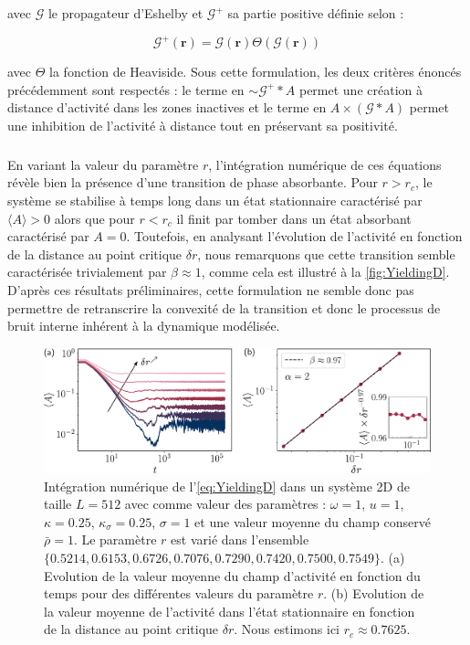 \noindent avec $\mathcal{G}$ le propagateur d'Eshelby et $\mathcal{G}^+$ sa partie positive définie selon :

\begin{equation}
	\mathcal{G}^+(\mathbf{r}) = \mathcal{G}(\mathbf{r})\Theta\left(\mathcal{G}(\mathbf{r})\right)
\end{equation}

\noindent avec $\Theta$ la fonction de Heaviside. Sous cette formulation, les deux critères énoncés précédemment sont respectés : le terme en $\sim \mathcal{G}^+\ast A$ permet une création à distance d'activité dans les zones inactives et le terme en $A\times (\mathcal{G}\ast A)$ permet une inhibition de l'activité à distance tout en préservant sa positivité.

\subparagraph{}En variant la valeur du paramètre $r$, l'intégration numérique de ces équations révèle bien la présence d'une transition de phase absorbante. Pour $r>r_c$, le système se stabilise à temps long dans un état stationnaire caractérisé par $\langle A \rangle > 0$ alors que pour $r<r_c$ il finit par tomber dans un état absorbant caractérisé par $A = 0$. Toutefois, en analysant l'évolution de l'activité en fonction de la distance au point critique $\delta r$, nous remarquons que cette transition semble caractérisée trivialement par $\beta \approx 1$, comme cela est illustré à la \autoref{fig:YieldingD}. D'après ces résultats préliminaires, cette formulation ne semble donc pas permettre de retranscrire la convexité de la transition et donc le processus de bruit interne inhérent à la dynamique modélisée.

\begin{figure}[h]
	\centering
	\includegraphics[width=\textwidth]{Chapitre5/Figures/YieldingD.pdf}
	\caption{Intégration numérique de l'\autoref{eq:YieldingD} dans un système 2D de taille $L=512$ avec comme valeur des paramètres : $\omega = 1$, $u = 1$, $\kappa = 0.25$, $\kappa_\sigma = 0.25$, $\sigma = 1$ et une valeur moyenne du champ conservé $\bar{\rho} = 1$. Le paramètre $r$ est varié dans l'ensemble $\{ 0.5214,  0.6153, 0.6726, 0.7076, 0.7290, 0.7420, 0.7500, 0.7549\}$. (a) Evolution de la valeur moyenne du champ d'activité en fonction du temps pour des différentes valeurs du paramètre $r$. (b) Evolution de la valeur moyenne de l'activité dans l'état stationnaire en fonction de la distance au point critique $\delta r$. Nous estimons ici $r_c \approx 0.7625$.}
	\label{fig:YieldingD}
\end{figure}

